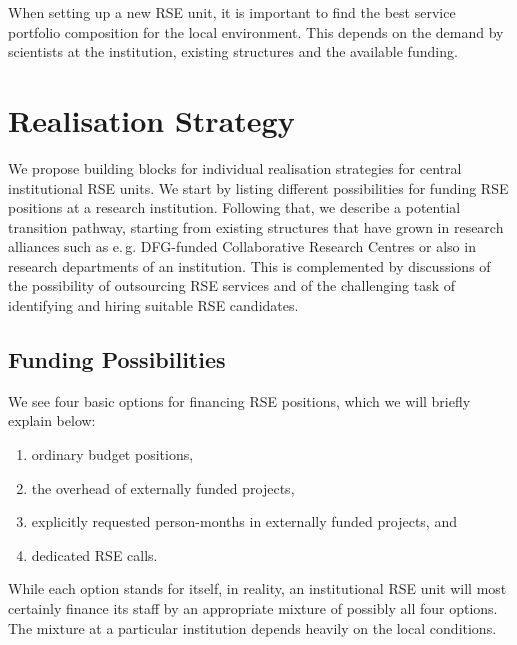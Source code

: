 \documentclass[a4paper]{article}
\makeatletter
\newcommand*{\eg}{e.\,g.\@\xspace}
\makeatother
\begin{document}
When setting up a new RSE unit, it is important to find the best service portfolio composition for the local environment.
This depends on the demand by scientists at the institution, existing structures and the available funding.

\section{Realisation Strategy}%
\label{sec:realization}

We propose building blocks for individual realisation strategies for central institutional RSE units.
We start by listing different possibilities for funding RSE positions at a research institution.
Following that, we describe a potential transition pathway, starting from existing structures that have grown in research alliances such as \eg{} DFG-funded Collaborative Research Centres or also in research departments of an institution.
This is complemented by discussions of the possibility of outsourcing RSE services and of the challenging task of identifying and hiring suitable RSE candidates.

\subsection{Funding Possibilities}%
\label{sec:funding}

We see four basic options for financing RSE positions, which we will briefly explain below:
\begin{enumerate}
\item ordinary budget positions,
\item the overhead of externally funded projects,
\item explicitly requested person-months in externally funded projects, and
\item dedicated RSE calls.
\end{enumerate}
While each option stands for itself, in reality, an institutional RSE unit will most certainly finance its staff by an appropriate mixture of possibly all four options.
The mixture at a particular institution depends heavily on the local conditions.
\end{document}
